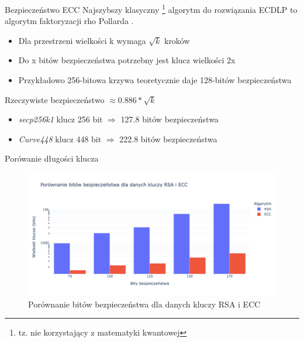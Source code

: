\begin{frame}{Bezpieczeństwo ECC}
Najszybszy klasyczny \footnote{tz. nie korzystający z matematyki kwantowej} algorytm do rozwiązania ECDLP to algorytm faktoryzacji rho Pollarda \cite{SolvingECDLP}.
\pause
\begin{itemize}
    \item Dla przestrzeni wielkości k wymaga $\sqrt{k}$ kroków
    \item Do x bitów bezpieczeństwa potrzebny jest klucz wielkości 2x
    \pause
    \item Przykładowo 256-bitowa krzywa teoretycznie daje 128-bitów bezpieczeństwa
\end{itemize}
\pause
Rzeczywiste bezpieczeństwo $\approx 0.886*\sqrt{k}$
\pause
\begin{itemize}
    \item \textit{secp256k1} klucz 256 bit $\Rightarrow$ 127.8 bitów bezpieczeństwa \cite{Secp256k1Security}
    \item \textit{Curve448} klucz 448 bit $\Rightarrow$ 222.8 bitów bezpieczeństwa \cite{Secp256k1Security}
\end{itemize}

\end{frame}

\begin{frame}{Porówanie długości klucza}
    \begin{figure}
        \centering
            \includegraphics[width=\textwidth]{security/graphics/Porównanie bitów bezpieczeństwa dla danych kluczy RSA i ECC}
            \caption{Porównanie bitów bezpieczeństwa dla danych kluczy RSA i ECC}
    \end{figure}
\end{frame}

